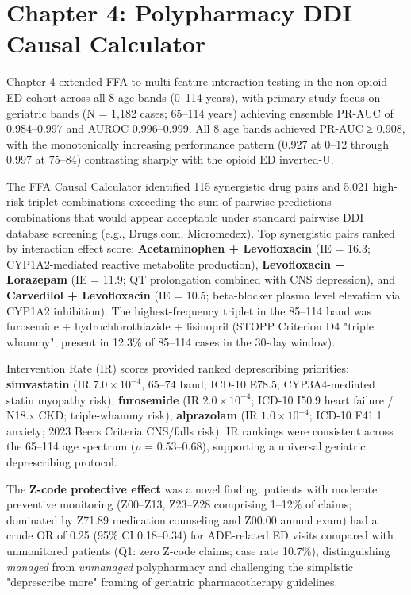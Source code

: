 \documentclass[
  12pt,
]{book}
\begin{document}
\section{Chapter 4: Polypharmacy DDI Causal
Calculator}\label{chapter-4-polypharmacy-ddi-causal-calculator}

Chapter 4 extended FFA to multi-feature interaction testing in the
non-opioid ED cohort across all 8 age bands (0--114 years), with primary
study focus on geriatric bands (N = 1,182 cases; 65--114 years)
achieving ensemble PR-AUC of 0.984--0.997 and AUROC 0.996--0.999. All 8
age bands achieved PR-AUC ≥ 0.908, with the monotonically increasing
performance pattern (0.927 at 0--12 through 0.997 at 75--84) contrasting
sharply with the opioid ED inverted-U.

The FFA Causal Calculator identified 115 synergistic drug pairs and
5,021 high-risk triplet combinations exceeding the sum of pairwise
predictions---combinations that would appear acceptable under standard
pairwise DDI database screening (e.g., Drugs.com, Micromedex). Top
synergistic pairs ranked by interaction effect score:
\textbf{Acetaminophen + Levofloxacin} (IE = 16.3; CYP1A2-mediated
reactive metabolite production), \textbf{Levofloxacin + Lorazepam} (IE =
11.9; QT prolongation combined with CNS depression), and
\textbf{Carvedilol + Levofloxacin} (IE = 10.5; beta-blocker plasma level
elevation via CYP1A2 inhibition). The highest-frequency triplet in the
85--114 band was furosemide + hydrochlorothiazide + lisinopril (STOPP
Criterion D4 "triple whammy"; present in 12.3\% of 85--114 cases in the
30-day window).

Intervention Rate (IR) scores provided ranked deprescribing priorities:
\textbf{simvastatin} (IR \(7.0\times10^{-4}\), 65--74 band; ICD-10
E78.5; CYP3A4-mediated statin myopathy risk); \textbf{furosemide} (IR
\(2.0\times10^{-4}\); ICD-10 I50.9 heart failure / N18.x CKD;
triple-whammy risk); \textbf{alprazolam} (IR \(1.0\times10^{-4}\);
ICD-10 F41.1 anxiety; 2023 Beers Criteria CNS/falls risk). IR rankings
were consistent across the 65--114 age spectrum (\(\rho\) = 0.53--0.68),
supporting a universal geriatric deprescribing protocol.

The \textbf{Z-code protective effect} was a novel finding: patients with
moderate preventive monitoring (Z00--Z13, Z23--Z28 comprising 1--12\% of
claims; dominated by Z71.89 medication counseling and Z00.00 annual
exam) had a crude OR of 0.25 (95\% CI 0.18--0.34) for ADE-related ED
visits compared with unmonitored patients (Q1: zero Z-code claims; case
rate 10.7\%), distinguishing \emph{managed} from \emph{unmanaged}
polypharmacy and challenging the simplistic "deprescribe more" framing
of geriatric pharmacotherapy guidelines.
\end{document}
